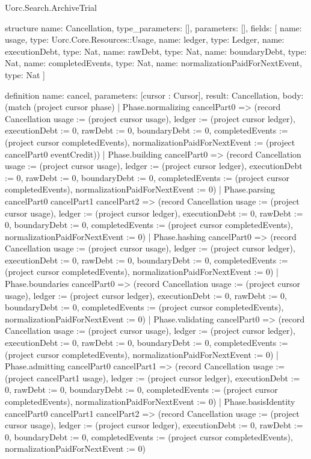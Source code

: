 \begin{lexlean}{Uorc.Search.ArchiveTrial}
\begin{semanticmodule}
structure{
  name: Cancellation,
  type_parameters: [],
  parameters: [],
  fields: [
    {name: usage, type: Uorc.Core.Resources::Usage},
    {name: ledger, type: Ledger},
    {name: executionDebt, type: Nat},
    {name: rawDebt, type: Nat},
    {name: boundaryDebt, type: Nat},
    {name: completedEvents, type: Nat},
    {name: normalizationPaidForNextEvent, type: Nat}
  ]
}

definition{
  name: cancel,
  parameters: [cursor : Cursor],
  result: Cancellation,
  body: (match (project cursor phase)
    | Phase.normalizing cancelPart0 => (record Cancellation {usage := (project cursor usage), ledger := (project cursor ledger), executionDebt := 0, rawDebt := 0, boundaryDebt := 0, completedEvents := (project cursor completedEvents), normalizationPaidForNextEvent := (project cancelPart0 eventCredit)})
    | Phase.building cancelPart0 => (record Cancellation {usage := (project cursor usage), ledger := (project cursor ledger), executionDebt := 0, rawDebt := 0, boundaryDebt := 0, completedEvents := (project cursor completedEvents), normalizationPaidForNextEvent := 0})
    | Phase.parsing cancelPart0 cancelPart1 cancelPart2 => (record Cancellation {usage := (project cursor usage), ledger := (project cursor ledger), executionDebt := 0, rawDebt := 0, boundaryDebt := 0, completedEvents := (project cursor completedEvents), normalizationPaidForNextEvent := 0})
    | Phase.hashing cancelPart0 => (record Cancellation {usage := (project cursor usage), ledger := (project cursor ledger), executionDebt := 0, rawDebt := 0, boundaryDebt := 0, completedEvents := (project cursor completedEvents), normalizationPaidForNextEvent := 0})
    | Phase.boundaries cancelPart0 => (record Cancellation {usage := (project cursor usage), ledger := (project cursor ledger), executionDebt := 0, rawDebt := 0, boundaryDebt := 0, completedEvents := (project cursor completedEvents), normalizationPaidForNextEvent := 0})
    | Phase.validating cancelPart0 => (record Cancellation {usage := (project cursor usage), ledger := (project cursor ledger), executionDebt := 0, rawDebt := 0, boundaryDebt := 0, completedEvents := (project cursor completedEvents), normalizationPaidForNextEvent := 0})
    | Phase.admitting cancelPart0 cancelPart1 => (record Cancellation {usage := (project cancelPart1 usage), ledger := (project cursor ledger), executionDebt := 0, rawDebt := 0, boundaryDebt := 0, completedEvents := (project cursor completedEvents), normalizationPaidForNextEvent := 0})
    | Phase.basisIdentity cancelPart0 cancelPart1 cancelPart2 => (record Cancellation {usage := (project cursor usage), ledger := (project cursor ledger), executionDebt := 0, rawDebt := 0, boundaryDebt := 0, completedEvents := (project cursor completedEvents), normalizationPaidForNextEvent := 0})
}
\end{semanticmodule}
\end{lexlean}
